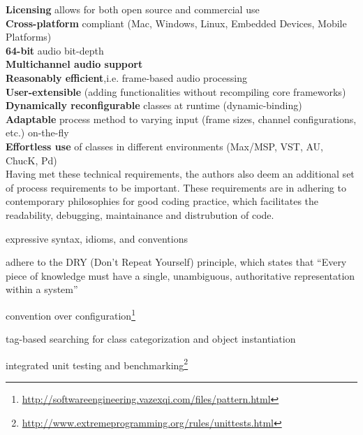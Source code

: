 \documentclass[twoside,10pt]{article}
\newenvironment{packed_item}{
\begin{itemize}
  \setlength{\itemsep}{1pt}
  \setlength{\parskip}{0pt}
  \setlength{\parsep}{0pt}
}{\end{itemize}}
\begin{document}
\noindent\textbf{Licensing} allows for both open source and commercial use\\
	\textbf{Cross-platform} compliant (Mac, Windows, Linux, Embedded Devices, Mobile Platforms)\\	
	\textbf{64-bit} audio bit-depth\\
	\textbf{Multichannel audio support}\\
	\textbf{Reasonably efficient},i.e. frame-based audio processing\\
	\textbf{User-extensible} (adding functionalities without recompiling core frameworks)\\
	\textbf{Dynamically reconfigurable} classes at runtime (dynamic-binding)\\
	\textbf{Adaptable} process method to varying input (frame sizes, channel configurations, etc.) on-the-fly\\
	\textbf{Effortless use} of classes in different environments (Max/MSP, VST, AU, ChucK, Pd)\\


\noindent Having met these technical requirements, the authors also deem an additional set of process requirements to be important.  These requirements are in adhering to contemporary philosophies for good coding practice, 
which facilitates the readability, debugging, maintainance and distrubution of code. 

\begin{packed_item}%
	\item expressive syntax, idioms, and conventions
	\item adhere to the DRY (Don't Repeat Yourself) principle, which states that ``Every piece of knowledge must have a single, unambiguous, authoritative representation within a system''\cite{Hunt:1999}
	\item convention over configuration\footnote{\url{http://softwareengineering.vazexqi.com/files/pattern.html}}
	\item tag-based searching for class categorization and object instantiation
	\item integrated unit testing and benchmarking\footnote{\url{http://www.extremeprogramming.org/rules/unittests.html}}
\end{packed_item}%
\end{document}
